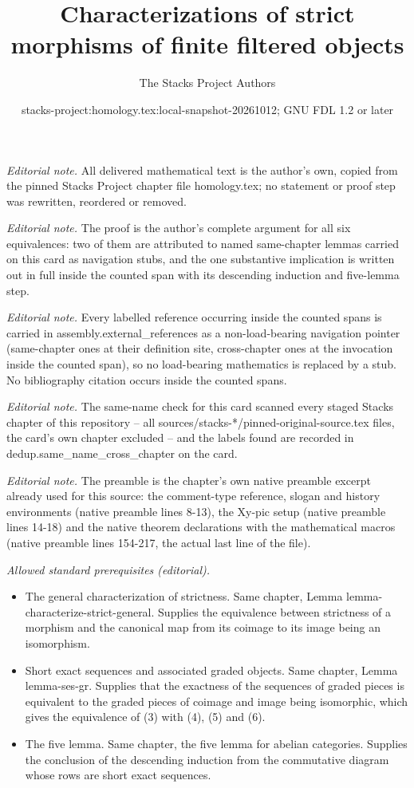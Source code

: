 \documentclass[10pt,a4paper]{amsart}
\title{Characterizations of strict morphisms of finite filtered objects}
\author{The Stacks Project Authors}
\date{stacks-project:homology.tex:local-snapshot-20261012; GNU FDL 1.2 or later}
\theoremstyle{plain}
\theoremstyle{definition}
\theoremstyle{remark}
\numberwithin{equation}{subsection}
\begin{document}
\maketitle
\noindent\textit{Editorial note.} All delivered mathematical text is the author's own, copied from the pinned Stacks Project chapter file homology.tex; no statement or proof step was rewritten, reordered or removed.\par\medskip
\noindent\textit{Editorial note.} The proof is the author's complete argument for all six equivalences: two of them are attributed to named same-chapter lemmas carried on this card as navigation stubs, and the one substantive implication is written out in full inside the counted span with its descending induction and five-lemma step.\par\medskip
\noindent\textit{Editorial note.} Every labelled reference occurring inside the counted spans is carried in assembly.external\_references as a non-load-bearing navigation pointer (same-chapter ones at their definition site, cross-chapter ones at the invocation inside the counted span), so no load-bearing mathematics is replaced by a stub. No bibliography citation occurs inside the counted spans.\par\medskip
\noindent\textit{Editorial note.} The same-name check for this card scanned every staged Stacks chapter of this repository -- all sources/stacks-*/pinned-original-source.tex files, the card's own chapter excluded -- and the labels found are recorded in dedup.same\_name\_cross\_chapter on the card.\par\medskip
\noindent\textit{Editorial note.} The preamble is the chapter's own native preamble excerpt already used for this source: the comment-type reference, slogan and history environments (native preamble lines 8-13), the Xy-pic setup (native preamble lines 14-18) and the native theorem declarations with the mathematical macros (native preamble lines 154-217, the actual last line of the file).\par\medskip
\noindent\textit{Allowed standard prerequisites (editorial).}\begin{itemize}
\item The general characterization of strictness. Same chapter, Lemma lemma-characterize-strict-general. Supplies the equivalence between strictness of a morphism and the canonical map from its coimage to its image being an isomorphism.
\item Short exact sequences and associated graded objects. Same chapter, Lemma lemma-ses-gr. Supplies that the exactness of the sequences of graded pieces is equivalent to the graded pieces of coimage and image being isomorphic, which gives the equivalence of (3) with (4), (5) and (6).
\item The five lemma. Same chapter, the five lemma for abelian categories. Supplies the conclusion of the descending induction from the commutative diagram whose rows are short exact sequences.
\end{itemize}\medskip
\end{document}
